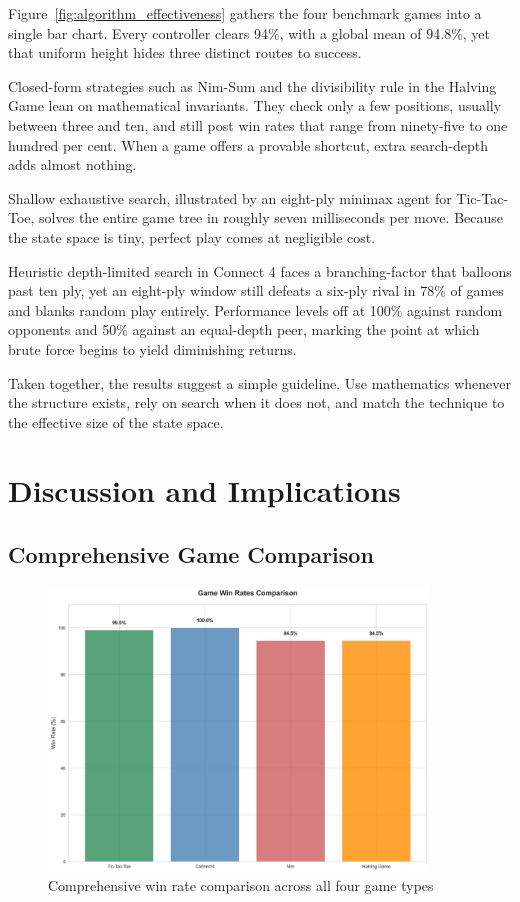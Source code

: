 \documentclass[12pt]{article}
\begin{document}
Figure~\ref{fig:algorithm_effectiveness} gathers the four benchmark games into a single bar chart. Every controller clears 94\%, with a global mean of 94.8\%, yet that uniform height hides three distinct routes to success.

Closed-form strategies such as Nim-Sum and the divisibility rule in the Halving Game lean on mathematical invariants. They check only a few positions, usually between three and ten, and still post win rates that range from ninety-five to one hundred per cent. When a game offers a provable shortcut, extra \gls{search-depth} adds almost nothing.

Shallow exhaustive search, illustrated by an eight-ply minimax agent for Tic-Tac-Toe, solves the entire game tree in roughly seven milliseconds per move. Because the state space is tiny, perfect play comes at negligible cost.

Heuristic depth-limited search in Connect 4 faces a \gls{branching-factor} that balloons past ten ply, yet an eight-ply window still defeats a six-ply rival in 78\% of games and blanks random play entirely. Performance levels off at 100\% against random opponents and 50\% against an equal-depth peer, marking the point at which brute force begins to yield diminishing returns.

Taken together, the results suggest a simple guideline. Use mathematics whenever the structure exists, rely on search when it does not, and match the technique to the effective size of the state space.

\section{Discussion and Implications}

\subsection{Comprehensive Game Comparison}

\begin{figure}[H]
\centering
\includegraphics[width=0.9\textwidth]{output/images/game_win_rates_comparison.png}
\caption{Comprehensive win rate comparison across all four game types}
\label{fig:game_comparison}
\end{figure}
\end{document}

